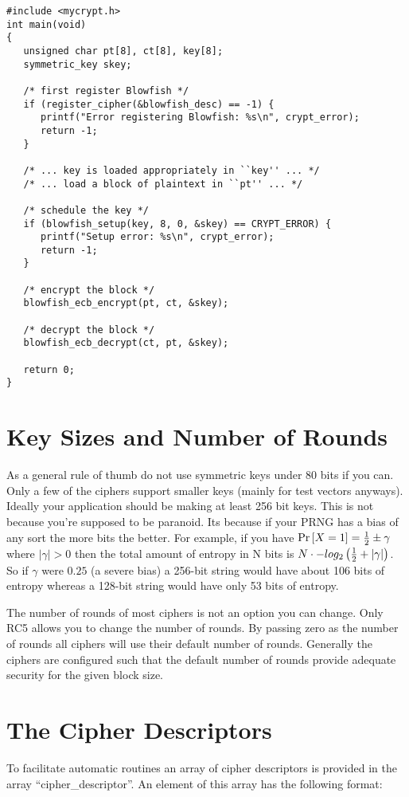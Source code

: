 \documentclass{book}
\begin{document}
\begin{small}
\begin{verbatim}
#include <mycrypt.h>
int main(void)
{ 
   unsigned char pt[8], ct[8], key[8];
   symmetric_key skey;

   /* first register Blowfish */
   if (register_cipher(&blowfish_desc) == -1) {
      printf("Error registering Blowfish: %s\n", crypt_error);
      return -1;
   }

   /* ... key is loaded appropriately in ``key'' ... */
   /* ... load a block of plaintext in ``pt'' ... */

   /* schedule the key */
   if (blowfish_setup(key, 8, 0, &skey) == CRYPT_ERROR) {
      printf("Setup error: %s\n", crypt_error);
      return -1;
   }

   /* encrypt the block */
   blowfish_ecb_encrypt(pt, ct, &skey);

   /* decrypt the block */
   blowfish_ecb_decrypt(ct, pt, &skey);

   return 0;
}
\end{verbatim}
\end{small}

\section{Key Sizes and Number of Rounds}
As a general rule of thumb do not use symmetric keys under 80 bits if you can.  Only a few of the ciphers support smaller
keys (mainly for test vectors anyways).  Ideally your application should be making at least 256 bit keys.  This is not
because you're supposed to be paranoid.  Its because if your PRNG has a bias of any sort the more bits the better.  For
example, if you have $\mbox{Pr}\left[X = 1\right] = {1 \over 2} \pm \gamma$ where $\vert \gamma \vert > 0$ then the
total amount of entropy in N bits is $N \cdot -log_2\left ({1 \over 2} + \vert \gamma \vert \right)$.  So if $\gamma$
were $0.25$ (a severe bias) a 256-bit string would have about 106 bits of entropy whereas a 128-bit string would have
only 53 bits of entropy.

The number of rounds of most ciphers is not an option you can change.  Only RC5 allows you to change the number of
rounds.  By passing zero as the number of rounds all ciphers will use their default number of rounds.  Generally the
ciphers are configured such that the default number of rounds provide adequate security for the given block size.

\section{The Cipher Descriptors}
To facilitate automatic routines an array of cipher descriptors is provided in the array ``cipher\_descriptor''.  An element
of this array has the following format:
\end{document}
